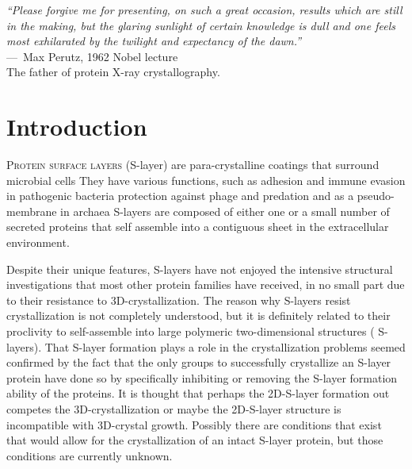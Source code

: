 \acresetall
{}
\begin{epigraph}
  \emph{``Please forgive me for presenting, on such a great occasion, results which are still in the making, but the glaring sunlight of certain knowledge is dull and one feels most exhilarated by the twilight and expectancy of the dawn.''} \\---~Max Perutz, 1962 Nobel lecture\\ The father of protein X-ray crystallography.
\end{epigraph}

\section{Introduction} %
\label{sec:crystal_introduction} 

\lettrine[lines=2]{P}{rotein surface layers} (\acs{S-layer}) are para-crystalline coatings that
surround microbial cells
 They have various functions, such as adhesion
and immune evasion in pathogenic bacteria
 protection against phage and predation
 and as a pseudo-membrane in archaea
 \acp{S-layer} are composed of either one or a small number of secreted proteins that self assemble
into a contiguous sheet in the extracellular environment. 

Despite their unique features, \acp{S-layer} have not enjoyed the intensive structural
investigations that most other protein families have received, in no
small part due to their resistance to 3D-crystallization. The reason why \acp{S-layer} resist
crystallization is not completely understood, but it is definitely related to their proclivity
to self-assemble into large polymeric two-dimensional structures (\ie
\acp{S-layer}). That \ac{S-layer} formation plays a role in the crystallization
problems seemed confirmed by the fact that the
 only groups to successfully crystallize an \ac{S-layer} protein
 have done so by specifically inhibiting or removing the \ac{S-layer} formation ability of
 the proteins. It is thought that perhaps
 the 2D-\ac{S-layer} formation out competes the 3D-crystallization or maybe the
 2D-\ac{S-layer} structure is incompatible with 3D-crystal growth. Possibly
 there are conditions that exist that would allow for the crystallization of an
 intact \ac{S-layer} protein, but those conditions are currently unknown.

